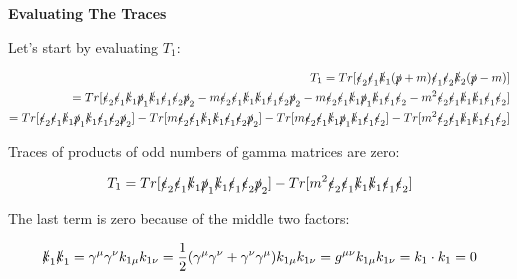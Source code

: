 \documentclass[a4]{article}
\begin{document}
    \textbf{Evaluating The Traces}

    Let's start by evaluating $T_1$:

    \begin{eqnarray}
        T_1 = Tr [\slashed{\epsilon}_2 \slashed{\epsilon}_1 \slashed{k}_1 (\slashed{p} + m) \slashed{\epsilon}_1 \slashed{\epsilon}_2 \slashed{k}_2 (\slashed{p} - m)] \\
        = Tr [\slashed{\epsilon}_2 \slashed{\epsilon}_1 \slashed{k}_1 \slashed{p}_1 \slashed{k}_1 \slashed{\epsilon}_1 \slashed{\epsilon}_2 \slashed{p}_2 - m \slashed{\epsilon}_2 \slashed{\epsilon}_1 \slashed{k}_1 \slashed{k}_1 \slashed{\epsilon}_1 \slashed{\epsilon}_2 \slashed{p}_2 - m \slashed{\epsilon}_2 \slashed{\epsilon}_1 \slashed{k}_1 \slashed{p}_1 \slashed{k}_1 \slashed{\epsilon}_1 \slashed{\epsilon}_2 - m^2 \slashed{\epsilon}_2 \slashed{\epsilon}_1 \slashed{k}_1 \slashed{k}_1 \slashed{\epsilon}_1 \slashed{\epsilon}_2] \\
        = Tr [\slashed{\epsilon}_2 \slashed{\epsilon}_1 \slashed{k}_1 \slashed{p}_1 \slashed{k}_1 \slashed{\epsilon}_1 \slashed{\epsilon}_2 \slashed{p}_2] - Tr [m \slashed{\epsilon}_2 \slashed{\epsilon}_1 \slashed{k}_1 \slashed{k}_1 \slashed{\epsilon}_1 \slashed{\epsilon}_2 \slashed{p}_2] - Tr [m \slashed{\epsilon}_2 \slashed{\epsilon}_1 \slashed{k}_1 \slashed{p}_1 \slashed{k}_1 \slashed{\epsilon}_1 \slashed{\epsilon}_2] - Tr[m^2 \slashed{\epsilon}_2 \slashed{\epsilon}_1 \slashed{k}_1 \slashed{k}_1 \slashed{\epsilon}_1 \slashed{\epsilon}_2]
    \end{eqnarray}

    Traces of products of odd numbers of gamma matrices are zero:

    \begin{equation}
        T_1 = Tr [\slashed{\epsilon}_2 \slashed{\epsilon}_1 \slashed{k}_1 \slashed{p}_1 \slashed{k}_1 \slashed{\epsilon}_1 \slashed{\epsilon}_2 \slashed{p}_2] - Tr[m^2 \slashed{\epsilon}_2 \slashed{\epsilon}_1 \slashed{k}_1 \slashed{k}_1 \slashed{\epsilon}_1 \slashed{\epsilon}_2]
    \end{equation}

    The last term is zero because of the middle two factors:

    \begin{equation}
        \slashed{k}_1 \slashed{k}_1 = \gamma^\mu \gamma^\nu k_{1 \mu} k_{1 \nu} = \frac{1}{2} (\gamma^\mu \gamma^\nu + \gamma^\nu \gamma^\mu) k_{1 \mu} k_{1 \nu} = g^{\mu \nu} k_{1 \mu} k_{1 \nu} = k_1 \cdot k_1 = 0
    \end{equation}
\end{document}
